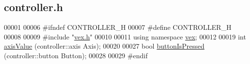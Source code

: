 \hypertarget{controller_8h_source}{}\subsection{controller.\+h}
\label{controller_8h_source}

\begin{DoxyCode}
00001 
00006 \textcolor{preprocessor}{#ifndef CONTROLLER\_H}
00007 \textcolor{preprocessor}{#define CONTROLLER\_H}
00008 
00009 \textcolor{preprocessor}{#include "\mbox{\hyperlink{vex_8h}{vex.h}}"}
00010 
00011 \textcolor{keyword}{using namespace }\mbox{\hyperlink{namespacevex}{vex}};
00012 
00019 \textcolor{keywordtype}{int} \mbox{\hyperlink{controller_8h_a73be3a8649e7d561a68cd816420efbd9_a73be3a8649e7d561a68cd816420efbd9}{axisValue}} (controller::axis Axis);
00020 
00027 \textcolor{keywordtype}{bool} \mbox{\hyperlink{controller_8h_aff3b02388de758f0fe6d98930ea57626_aff3b02388de758f0fe6d98930ea57626}{buttonIsPressed}} (controller::button Button);
00028 
00029 \textcolor{preprocessor}{#endif}
\end{DoxyCode}
